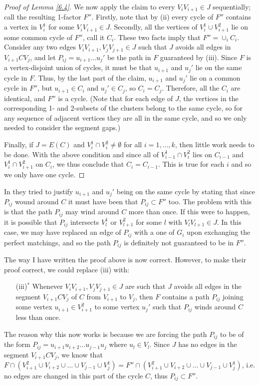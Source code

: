 \documentclass[10pt,letterpaper, reqno]{amsart}
\theoremstyle{definition}
\numberwithin{equation}{section}
\begin{document}
\begin{proof}[Proof of Lemma \ref{6.4}]
	\noindent We now apply the claim to every $V_i V_{i+1} \in J$ sequentially; call the resulting 1-factor $F''$. Firstly, note that by (ii) every cycle of $F''$ contains a vertex in $V_i^1$ for some $V_i V_{i+1} \in J$. Secondly, all the vertices of $V^1_i \cup V^2_{i+1}$ lie on some common cycle of $F''$, call it $C_i$. These two facts imply that $F'' = \cup_i C_i$. Consider any two edges $V_i V_{i+1}, V_j V_{j+1} \in J$ such that $J$ avoids all edges in $V_{i+1}CV_j$, and let $P_{ij} = u_{i+1} \dots u_j'$ be the path  in $F$ guaranteed by (iii). Since $F$ is a vertex-disjoint union of cycles, it must be that $u_{i+1}$ and $u_j'$ lie on the same cycle in $F$. Thus, by the last part of the claim, $u_{i+1}$ and $ u_j'$ lie on a common cycle in $F''$, but $u_{i+1} \in C_i$ and $u_j' \in C_j$, so $C_i=C_j$. Therefore, all the $C_i$ are identical, and $F''$ is a cycle. (Note that for each edge of $J$, the vertices in the corresponding 1- and 2-subsets of the clusters belong to the same cycle, so for any sequence of adjacent vertices they are all in the same cycle, and so we only needed to consider the segment gaps.)
	
	Finally, if $J=E(C)$ and $V_i ^1 \cap V_{i}^2 \neq \emptyset $ for all $i=1,\dots,k$, then little work needs to be done. With the above condition and since all of $V_{i-1}^1 \cap V_i^2$ lies on $C_{i-1}$ and $V_{i}^1 \cap V_{i+1}^2$ on $C_{i}$, we thus conclude that $C_i=C_{i-1}$. This is true for each $i$ and so we only have one cycle. 
\end{proof}

\noindent In \cite{HamiltonDecomp} they tried to justify $u_{i+1}$ and $u_j'$ being on the same cycle by stating that since $P_{ij}$ wound around $C$ it must have been that $P_{ij}\subset F''$ too. The problem with this is that the path $P_{ij}$ may wind around $C$ more than once. If this were to happen, it is possible that $P_{ij}$ intersects $V^1_l$ or $V^2_{l+1}$ for some $l$ with $V_lV_{l+1} \in J$. In this case, we may have replaced an edge of $P_{ij}$ with a one of $G_i$ upon exchanging the perfect matchings, and so the path $P_{ij}$ is definitely not guaranteed to be in $F''$. 

The way I have written the proof above is now correct. However, to make their proof correct, we could replace (iii) with:
\begin{itemize}
	\item[(iii)$^*$] Whenever $V_i V_{i+1}, V_j V_{j+1} \in J$ are such that $J$ avoids all edges in the segment $V_{i+1}CV_j$ of $C$ from $V_{i+1}$ to $V_j$, then $F$ contains a path $P_{ij}$ joining some vertex $u_{i+1} \in V^2_{i+1}$ to some vertex $u_j'$ such that $P_{ij}$ winds around $C$ less than once.
\end{itemize}
The reason why this now works is because we are forcing the path $P_{ij}$ to be of the form $P_{ij} = u_{i+1} u_{i+2} \dots u_{j-1} u_j$ where $u_l \in V_l$. Since $J$ has no edges in the segment $V_{i+1}CV_j$, we know that $F \cap (V^2_{i+1} \cup V_{i+2} \cup \dots \cup V_{j-1} \cup V_{j}^1) = F'' \cap  (V^2_{i+1} \cup  V_{i+2} \cup \dots \cup V_{j-1}\cup V_{j}^1)$, i.e. no edges are changed in this part of the cycle $C$, thus $P_{ij} \subset F''$.
\end{document}
